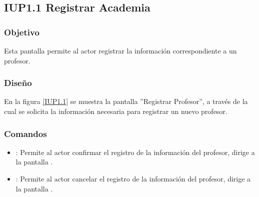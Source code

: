 \subsection{IUP1.1 Registrar Academia}

\subsubsection{Objetivo}
	Esta pantalla permite al actor registrar la información correspondiente a un profesor.

\subsubsection{Diseño}

    En la figura \ref{IUP1.1} se muestra la pantalla ''Registrar Profesor'', a través de la cual se solicita la información necesaria para registrar un nuevo profesor.
 

\subsubsection{Comandos}
    \begin{itemize}
	\item {}: Permite al actor confirmar el registro de la información del profesor, dirige a la pantalla .
	
	\item {}: Permite al actor cancelar el registro de la información del profesor, dirige a la pantalla .
    \end{itemize}
